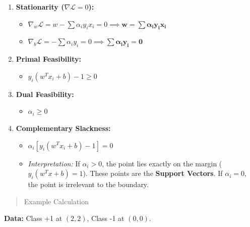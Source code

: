 \documentclass[
  letterpaper,
  DIV=11,
  numbers=noendperiod]{scrreprt}
\providecommand{\tightlist}{%
  \setlength{\itemsep}{0pt}\setlength{\parskip}{0pt}}
\begin{document}
\begin{enumerate}
\def\labelenumi{\arabic{enumi}.}
\tightlist
\item
  \textbf{Stationarity (\(\nabla \mathcal{L} = 0\)):}

  \begin{itemize}
  \tightlist
  \item
    \(\nabla_w \mathcal{L} = w - \sum \alpha_i y_i x_i = 0 \implies \mathbf{w = \sum \alpha_i y_i x_i}\)
  \item
    \(\nabla_b \mathcal{L} = -\sum \alpha_i y_i = 0 \implies \mathbf{\sum \alpha_i y_i = 0}\)
  \end{itemize}
\item
  \textbf{Primal Feasibility:}

  \begin{itemize}
  \tightlist
  \item
    \(y_i(w^T x_i + b) - 1 \ge 0\)
  \end{itemize}
\item
  \textbf{Dual Feasibility:}

  \begin{itemize}
  \tightlist
  \item
    \(\alpha_i \ge 0\)
  \end{itemize}
\item
  \textbf{Complementary Slackness:}

  \begin{itemize}
  \tightlist
  \item
    \(\alpha_i [y_i(w^T x_i + b) - 1] = 0\)
  \item
    \emph{Interpretation:} If \(\alpha_i > 0\), the point lies exactly
    on the margin (\(y_i(w^T x + b) = 1\)). These points are the
    \textbf{Support Vectors}. If \(\alpha_i = 0\), the point is
    irrelevant to the boundary.
  \end{itemize}
\end{enumerate}

\begin{quote}
Example Calculation
\end{quote}

\textbf{Data:} Class +1 at \((2,2)\), Class -1 at \((0,0)\).
\end{document}
